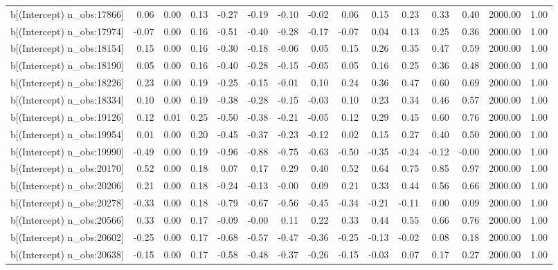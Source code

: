 \begin{table}[ht]
\begin{tabular}{rrrrrrrrrrrrrrr}
  b[(Intercept) n\_obs:17866] & 0.06 & 0.00 & 0.13 & -0.27 & -0.19 & -0.10 & -0.02 & 0.06 & 0.15 & 0.23 & 0.33 & 0.40 & 2000.00 & 1.00 \\ 
  b[(Intercept) n\_obs:17974] & -0.07 & 0.00 & 0.16 & -0.51 & -0.40 & -0.28 & -0.17 & -0.07 & 0.04 & 0.13 & 0.25 & 0.36 & 2000.00 & 1.00 \\ 
  b[(Intercept) n\_obs:18154] & 0.15 & 0.00 & 0.16 & -0.30 & -0.18 & -0.06 & 0.05 & 0.15 & 0.26 & 0.35 & 0.47 & 0.59 & 2000.00 & 1.00 \\ 
  b[(Intercept) n\_obs:18190] & 0.05 & 0.00 & 0.16 & -0.40 & -0.28 & -0.15 & -0.05 & 0.05 & 0.16 & 0.25 & 0.36 & 0.48 & 2000.00 & 1.00 \\ 
  b[(Intercept) n\_obs:18226] & 0.23 & 0.00 & 0.19 & -0.25 & -0.15 & -0.01 & 0.10 & 0.24 & 0.36 & 0.47 & 0.60 & 0.69 & 2000.00 & 1.00 \\ 
  b[(Intercept) n\_obs:18334] & 0.10 & 0.00 & 0.19 & -0.38 & -0.28 & -0.15 & -0.03 & 0.10 & 0.23 & 0.34 & 0.46 & 0.57 & 2000.00 & 1.00 \\ 
  b[(Intercept) n\_obs:19126] & 0.12 & 0.01 & 0.25 & -0.50 & -0.38 & -0.21 & -0.05 & 0.12 & 0.29 & 0.45 & 0.60 & 0.76 & 2000.00 & 1.00 \\ 
  b[(Intercept) n\_obs:19954] & 0.01 & 0.00 & 0.20 & -0.45 & -0.37 & -0.23 & -0.12 & 0.02 & 0.15 & 0.27 & 0.40 & 0.50 & 2000.00 & 1.00 \\ 
  b[(Intercept) n\_obs:19990] & -0.49 & 0.00 & 0.19 & -0.96 & -0.88 & -0.75 & -0.63 & -0.50 & -0.35 & -0.24 & -0.12 & -0.00 & 2000.00 & 1.00 \\ 
  b[(Intercept) n\_obs:20170] & 0.52 & 0.00 & 0.18 & 0.07 & 0.17 & 0.29 & 0.40 & 0.52 & 0.64 & 0.75 & 0.85 & 0.97 & 2000.00 & 1.00 \\ 
  b[(Intercept) n\_obs:20206] & 0.21 & 0.00 & 0.18 & -0.24 & -0.13 & -0.00 & 0.09 & 0.21 & 0.33 & 0.44 & 0.56 & 0.66 & 2000.00 & 1.00 \\ 
  b[(Intercept) n\_obs:20278] & -0.33 & 0.00 & 0.18 & -0.79 & -0.67 & -0.56 & -0.45 & -0.34 & -0.21 & -0.11 & 0.00 & 0.09 & 2000.00 & 1.00 \\ 
  b[(Intercept) n\_obs:20566] & 0.33 & 0.00 & 0.17 & -0.09 & -0.00 & 0.11 & 0.22 & 0.33 & 0.44 & 0.55 & 0.66 & 0.76 & 2000.00 & 1.00 \\ 
  b[(Intercept) n\_obs:20602] & -0.25 & 0.00 & 0.17 & -0.68 & -0.57 & -0.47 & -0.36 & -0.25 & -0.13 & -0.02 & 0.08 & 0.18 & 2000.00 & 1.00 \\ 
  b[(Intercept) n\_obs:20638] & -0.15 & 0.00 & 0.17 & -0.58 & -0.48 & -0.37 & -0.26 & -0.15 & -0.03 & 0.07 & 0.17 & 0.27 & 2000.00 & 1.00 \\ 

\end{tabular}
\end{table}
